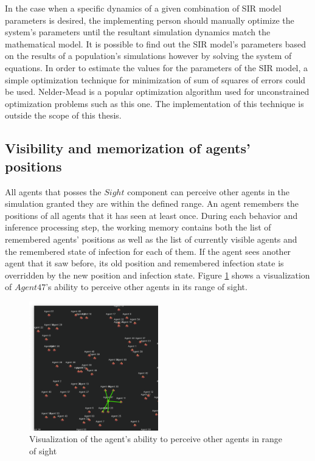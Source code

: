 In the case when a specific dynamics of a given combination of SIR model parameters is desired, the implementing person should manually optimize the system's parameters until the resultant simulation dynamics match the mathematical model.
It is possible to find out the SIR model's parameters based on the results of a population's simulations however by solving the system of equations.
In order to estimate the values for the parameters of the SIR model, a simple optimization technique for minimization of sum of squares of errors could be used.
Nelder-Mead is a popular optimization algorithm used for unconstrained optimization problems such as this one\cite{singer2009nelder}.
The implementation of this technique is outside the scope of this thesis.

\subsection{Visibility and memorization of agents' positions}

All agents that posses the $Sight$ component can perceive other agents in the simulation granted they are within the defined range.
An agent remembers the positions of all agents that it has seen at least once.
During each behavior and inference processing step, the working memory contains both the list of remembered agents' positions as well as the list of currently visible agents and the remembered state of infection for each of them.
If the agent sees another agent that it saw before, its old position and remembered infection state is overridden by the new position and infection state.
Figure \ref{fig:images/visibility/agent47.png} shows a visualization of $Agent47$'s ability to perceive other agents in its range of sight.

\begin{figure}[H]
    \centering
    \includegraphics[width=0.5\textwidth]{images/visibility/agent47.png}
    \caption{Visualization of the agent's ability to perceive other agents in range of sight}\label{fig:images/visibility/agent47.png}
\end{figure}

